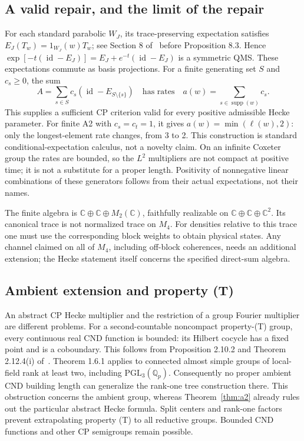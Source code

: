 \documentclass[11pt]{article}
\theoremstyle{remark}\newtheorem{remark}[definition]{Remark}
\newcommand{\id}{\operatorname{id}}
\newcommand{\supp}{\operatorname{supp}}
\newcommand{\C}{\mathbb{C}}
\newcommand{\Q}{\mathbb{Q}}
\begin{document}
\subsection{A valid repair, and the limit of the repair}
For each standard parabolic $W_J$, its trace-preserving expectation satisfies
$E_J(T_w)=1_{W_J}(w)T_w$; see Section 8 of~\cite{CaspersEtAl2023} before Proposition 8.3. Hence
$\exp[-t(\id-E_J)]=E_J+e^{-t}(\id-E_J)$ is a symmetric QMS.
These expectations commute as basis projections. For a finite generating
set $S$ and $c_s\geq0$, the sum
\[
 A=\sum_{s\in S}c_s(\id-E_{S\setminus\{s\}})
 \quad\text{has rates}\quad
 a(w)=\sum_{s\in\supp(w)}c_s.
\]
This supplies a sufficient CP criterion valid for every positive admissible
Hecke parameter. For finite A2 with $c_s=c_t=1$, it gives
$a(w)=\min(\ell(w),2)$: only the longest-element rate changes, from 3 to 2.
This construction is standard conditional-expectation calculus, not a
novelty claim. On an infinite Coxeter group the rates are bounded, so the
$L^2$ multipliers are not compact at positive time; it is not a substitute
for a proper length. Positivity of nonnegative linear combinations of
these generators follows from their actual expectations, not their names.

The finite algebra is $\C\oplus\C\oplus M_2(\C)$, faithfully realizable
on $\C\oplus\C\oplus\C^2$. Its canonical trace is not normalized trace
on $M_4$. For densities relative to this trace one must use the
corresponding block weights to obtain physical states. Any channel claimed
on all of $M_4$, including off-block coherences, needs an additional
extension; the Hecke statement itself concerns the specified direct-sum
algebra.

\subsection{Ambient extension and property (T)}
An abstract CP Hecke multiplier and the restriction of a group Fourier
multiplier are different problems. For a second-countable noncompact
property-(T) group, every continuous real CND function is bounded:
its Hilbert cocycle has a fixed point and is a coboundary. This follows
from Proposition 2.10.2 and Theorem 2.12.4(i) of~\cite{BekkaHarpeValette2008}. Theorem 1.6.1 applies to connected almost
simple groups of local-field rank at least two, including
$\mathrm{PGL}_3(\Q_p)$. Consequently no proper ambient CND building
length can generalize the rank-one tree construction there.
This obstruction concerns the ambient group, whereas Theorem~\ref{thm:a2}
already rules out the particular abstract Hecke formula. Split centers
and rank-one factors prevent extrapolating property (T) to all reductive
groups. Bounded CND functions and other CP semigroups remain possible.
\end{document}
